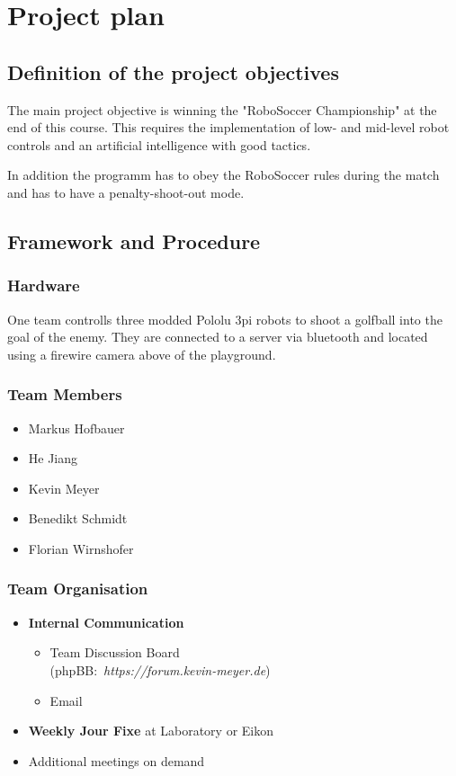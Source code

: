 \documentclass[12pt]{article}
\begin{document}
\section{Project plan}
\subsection{Definition of the project objectives}
The main project objective is winning the "RoboSoccer Championship" at the end of this course. 
This requires the implementation of low- and mid-level robot controls and an artificial intelligence with good tactics.

In addition the programm has to obey the RoboSoccer rules during the match and has to have a penalty-shoot-out mode.

\subsection{Framework and Procedure}
\subsubsection*{Hardware}
One team controlls three modded Pololu 3pi robots to shoot a golfball into the goal of the enemy.
They are connected to a server via bluetooth and located using a firewire camera above of the playground.

\subsubsection*{Team Members}
\begin{itemize}
	\item Markus Hofbauer
	\item He Jiang
	\item Kevin Meyer
	\item Benedikt Schmidt
	\item Florian Wirnshofer
\end{itemize}

\subsubsection*{Team Organisation}
\begin{itemize}
	\item \textbf{Internal Communication}
	\begin{itemize}
		\item Team Discussion Board \\\mbox{(phpBB: \textit{https://forum.kevin-meyer.de})}
		\item Email
	\end{itemize}
	\item \textbf{Weekly Jour Fixe} at Laboratory or Eikon
	\item Additional meetings on demand
\end{itemize}
\end{document}
